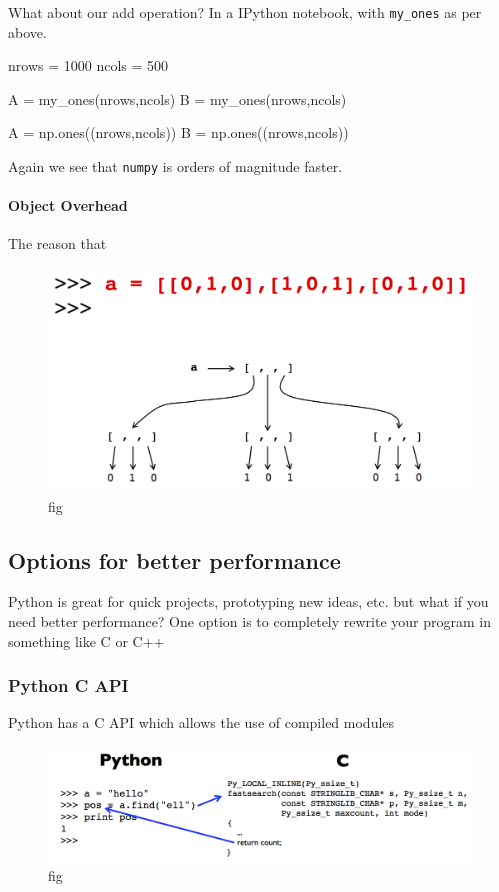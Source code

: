 \documentclass[12pt,letterpaper,twoside]{article}
\begin{document}
What about our add operation? In a IPython notebook, with \texttt{my\_ones} as per above.

\begin{python}[basicstyle=\footnotesize]
nrows = 1000
ncols = 500

A = my_ones(nrows,ncols)
B = my_ones(nrows,ncols)

A = np.ones((nrows,ncols))
B = np.ones((nrows,ncols))
\end{python}

Again we see that \texttt{numpy} is orders of magnitude faster.

\paragraph{Object Overhead} The reason that 

\begin{figure}[h]
\centering
\includegraphics[scale=0.45]{fig/object-overhead.png}
\caption{fig}
\end{figure}

\subsection{Options for better performance}

Python is great for quick projects, prototyping new ideas, etc. but
what if you need better performance?
One option is to completely rewrite your program in something like
C or C++

\subsubsection{Python C API}
Python has a C API which allows the use of compiled modules

\begin{figure}[h]
\centering
\includegraphics[scale=0.45]{fig/python-c-interface.png}
\caption{fig}
\end{figure}
\end{document}
